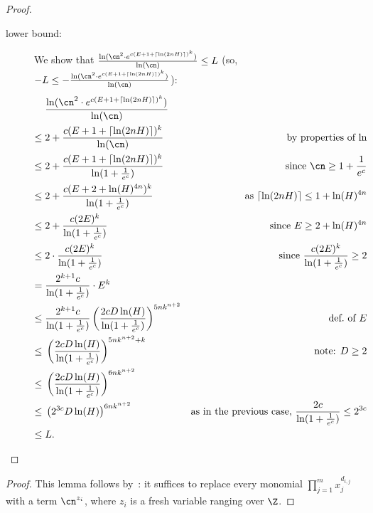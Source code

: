 \begin{proof}
\begin{description}
          \item[lower bound:] We show that $\frac{\ln(\cn^2 \cdot e^{c(E+1+\ceil{\ln(2nH)})^k})}{\ln(\cn)} \leq L$ (so, $-L \leq -\frac{\ln(\cn^2 \cdot e^{c(E+1+\ceil{\ln(2nH)})^k})}{\ln(\cn)}$):
          \begin{align*} 
            & \frac{\ln(\cn^2 \cdot e^{c(E+1+\ceil{\ln(2nH)})^k})}{\ln(\cn)}\\
            \leq{}& 2 + \frac{c(E+1+\ceil{\ln(2nH)})^k}{\ln(\cn)} 
            & \text{by properties of $\ln$}\\ 
            \leq{}& 2 + \frac{c(E+1+\ceil{\ln(2nH)})^k}{\ln(1+\frac{1}{e^c})} 
            & \text{since $\cn \geq 1 + \frac{1}{e^c}$}\\ 
            \leq{}& 2 + \frac{c(E+2+\ln(H)^{4n})^k}{\ln(1+\frac{1}{e^c})} 
            & \text{as $\ceil{\ln(2nH)} \leq 1 + \ln(H)^{4n}$}\\ 
            \leq{}& 2 + \frac{c(2E)^k}{\ln(1+\frac{1}{e^c})} 
            & \text{since $E \geq 2 + \ln(H)^{4n}$}\\ 
            \leq{}& 2 \cdot \frac{c(2E)^k}{\ln(1+\frac{1}{e^c})} 
            & \text{since $\frac{c(2E)^k}{\ln(1+\frac{1}{e^c})} \geq 2$}\\ 
            ={}& \frac{2^{k+1}c}{\ln(1+\frac{1}{e^c})} \cdot E^k\\
            \leq{}& \frac{2^{k+1}c}{\ln(1+\frac{1}{e^c})}\left(\frac{2cD\ln(H)}{\ln(1 + \frac{1}{e^c})}\right)^{5nk^{n+2}}
            & \text{def.~of~$E$}\\
            \leq{}& \left(\frac{2cD\ln(H)}{\ln(1 + \frac{1}{e^c})}\right)^{5nk^{n+2}+k}
            & \text{note: $D \geq 2$}\\
            \leq{}& \left(\frac{2cD\ln(H)}{\ln(1 + \frac{1}{e^c})}\right)^{6nk^{n+2}}\\
            \leq{}& \left(2^{3c}D\ln(H)\right)^{6nk^{n+2}}
            & 
            \text{as in the previous case, } \frac{2c}{\ln(1+\frac{1}{e^c})} \leq 2^{3c}
            \\
            \leq{}& L.
            &&\qedhere
          \end{align*}
        \end{description}
  \end{proof}

  \LemmaLambdaCloseToVariableBody* 

  \begin{proof}
    This lemma follows by~: it suffices to replace every monomial $\prod_{j=1}^m x_j^{d_{i,j}}$ with a term $\cn^{z_i}$, where $z_i$ is a fresh variable ranging over $\Z$.
  \end{proof}

